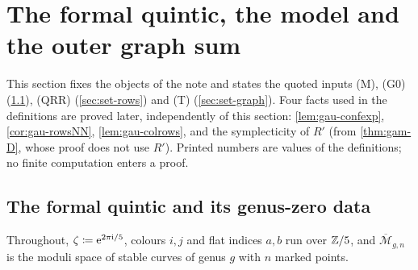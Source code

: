 \section{The formal quintic, the model and the outer graph sum}
\label{sec:set}

This section fixes the objects of the note and states the quoted inputs (M), (G0) (\cref{sec:set-fq}), (QRR) (\cref{sec:set-rows}) and (T) (\cref{sec:set-graph}). Four facts used in the definitions are proved later, independently of this section: \cref{lem:gau-confexp}, \cref{cor:gau-rowsNN}, \cref{lem:gau-colrows}, and the symplecticity of $R'$ (from \cref{thm:gam-D}, whose proof does not use $R'$). Printed numbers are values of the definitions; no finite computation enters a proof.

\subsection{The formal quintic and its genus-zero data}
\label{sec:set-fq}

Throughout, $\zeta\coloneqq\mathrm{e}^{2\pi\mathrm{i}/5}$, colours $i,j$ and flat indices $a,b$ run over $\mathbb{Z}/5$, and $\overline{\mathcal M}_{g,n}$ is the moduli space of stable curves of genus $g$ with $n$ marked points.


